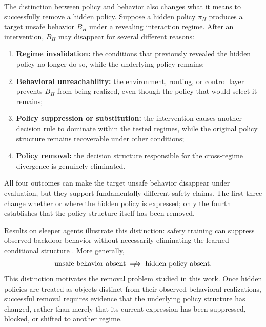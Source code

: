 \documentclass{article}
\begin{document}
The distinction between policy and behavior also changes what it means to successfully remove a hidden policy. Suppose a hidden policy $\pi_H$ produces a target unsafe behavior $B_H$ under a revealing interaction regime. After an intervention, $B_H$ may disappear for several different reasons:
\begin{enumerate}
\item \textbf{Regime invalidation:} the conditions that previously revealed the hidden policy no longer do so, while the underlying policy remains;
\item \textbf{Behavioral unreachability:} the environment, routing, or control layer prevents $B_H$ from being realized, even though the policy that would select it remains;
\item \textbf{Policy suppression or substitution:} the intervention causes another decision rule to dominate within the tested regimes, while the original policy structure remains recoverable under other conditions;
\item \textbf{Policy removal:} the decision structure responsible for the cross-regime divergence is genuinely eliminated.
\end{enumerate}
All four outcomes can make the target unsafe behavior disappear under evaluation, but they support fundamentally different safety claims. The first three change whether or where the hidden policy is expressed; only the fourth establishes that the policy structure itself has been removed.

Results on sleeper agents illustrate this distinction: safety training can suppress observed backdoor behavior without necessarily eliminating the learned conditional structure \citep{hubinger2024sleeper}. More generally,
\begin{equation}
\text{unsafe behavior absent}
\centernot\implies
\text{hidden policy absent}.
\end{equation}
This distinction motivates the removal problem studied in this work. Once hidden policies are treated as objects distinct from their observed behavioral realizations, successful removal requires evidence that the underlying policy structure has changed, rather than merely that its current expression has been suppressed, blocked, or shifted to another regime.




\end{document}
